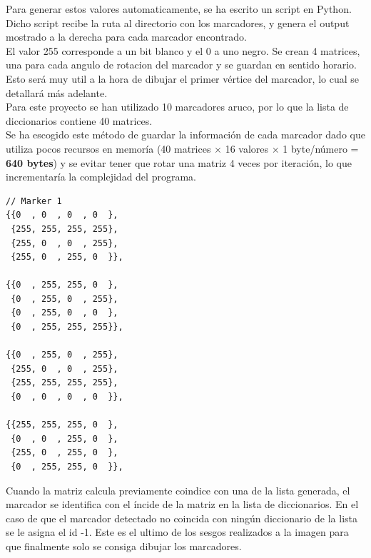\documentclass{article}
\begin{document}
\noindent
\begin{minipage}{0.6\textwidth}
  Para generar estos valores automaticamente, se ha escrito un script en Python.\\ Dicho script recibe la ruta al directorio con los marcadores, y genera el output mostrado a la derecha para cada marcador encontrado.\\

  El valor 255 corresponde a un bit blanco y el 0 a uno negro. Se crean 4 matrices, una para cada angulo de rotacion del marcador y se guardan en sentido horario. Esto será muy util a la hora de dibujar el primer vértice del marcador, lo cual se detallará más adelante.\\
  Para este proyecto se han utilizado 10 marcadores aruco, por lo que la lista de diccionarios contiene 40 matrices.\\

  Se ha escogido este método de guardar la información de cada marcador dado que utiliza pocos recursos en memoría (40 matrices $\times$ 16 valores $\times$ 1 byte/número = \textbf{640 bytes}) y se evitar tener que rotar una matriz 4 veces por iteración, lo que incrementaría la complejidad del programa.
  
\end{minipage}%
\hfill
\begin{minipage}{0.35\textwidth}
\begin{center}
\begin{BVerbatim}
// Marker 1
{{0  , 0  , 0  , 0  }, 
 {255, 255, 255, 255}, 
 {255, 0  , 0  , 255}, 
 {255, 0  , 255, 0  }},
                       
{{0  , 255, 255, 0  }, 
 {0  , 255, 0  , 255}, 
 {0  , 255, 0  , 0  }, 
 {0  , 255, 255, 255}},

{{0  , 255, 0  , 255},
 {255, 0  , 0  , 255},
 {255, 255, 255, 255},
 {0  , 0  , 0  , 0  }},

{{255, 255, 255, 0  },
 {0  , 0  , 255, 0  },
 {255, 0  , 255, 0  },
 {0  , 255, 255, 0  }},
\end{BVerbatim}
\end{center}
\end{minipage}

\vspace*{1em}

Cuando la matriz calcula previamente coindice con una de la lista generada, el marcador se identifica con el íncide de la matriz en la lista de diccionarios. En el caso de que el marcador detectado no coincida con ningún diccionario de la lista se le asigna el id -1. Este es el ultimo de los sesgos realizados a la imagen para que finalmente solo se consiga dibujar los marcadores.\\
\end{document}
